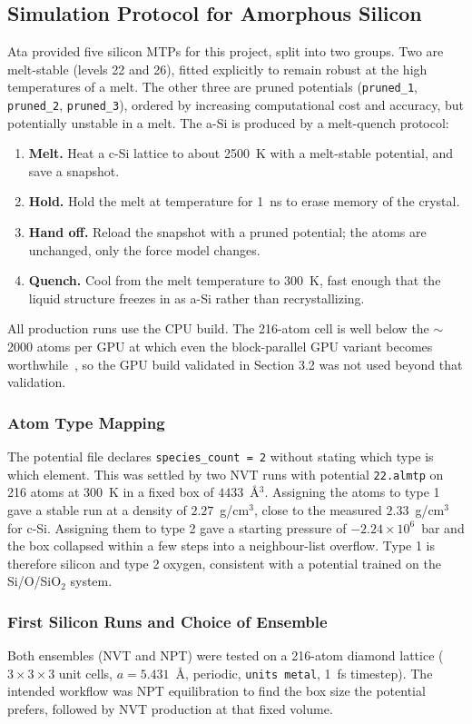 \documentclass{article}
\begin{document}
\subsection{Simulation Protocol for Amorphous Silicon}
Ata provided five silicon MTPs for this project, split into two groups. Two are melt-stable (levels 22 and 26), fitted explicitly to remain robust at the high temperatures of a melt. The other three are pruned potentials (\texttt{pruned\_1}, \texttt{pruned\_2}, \texttt{pruned\_3}), ordered by increasing computational cost and accuracy, but potentially unstable in a melt. The a-Si is produced by a melt-quench protocol:
\begin{enumerate}
    \item \textbf{Melt.} Heat a c-Si lattice to about 2500~K with a melt-stable potential, and save a snapshot.
    \item \textbf{Hold.} Hold the melt at temperature for 1~ns to erase memory of the crystal.
    \item \textbf{Hand off.} Reload the snapshot with a pruned potential; the atoms are unchanged, only the force model changes.
    \item \textbf{Quench.} Cool from the melt temperature to 300~K, fast enough that the liquid structure freezes in as a-Si rather than recrystallizing.
\end{enumerate}
All production runs use the CPU build. The 216-atom cell is well below the $\sim$2000 atoms per GPU at which even the block-parallel GPU variant becomes worthwhile~\cite{meng2026}, so the GPU build validated in Section 3.2 was not used beyond that validation.

\subsubsection{Atom Type Mapping}
The potential file declares \texttt{species\_count = 2} without stating which type is which element. This was settled by two NVT runs with potential \texttt{22.almtp} on 216 atoms at 300~K in a fixed box of $4433$~\AA$^3$. Assigning the atoms to type 1 gave a stable run at a density of $2.27$~g/cm$^3$, close to the measured $2.33$~g/cm$^3$ for c-Si. Assigning them to type 2 gave a starting pressure of $-2.24\times10^{6}$~bar and the box collapsed within a few steps into a neighbour-list overflow. Type 1 is therefore silicon and type 2 oxygen, consistent with a potential trained on the Si/O/SiO$_2$ system.

\subsubsection{First Silicon Runs and Choice of Ensemble}
\label{sec:firstruns}
Both ensembles (NVT and NPT) were tested on a 216-atom diamond lattice ($3\times3\times3$ unit cells, $a=5.431$~\AA, periodic, \texttt{units metal}, 1~fs timestep). The intended workflow was NPT equilibration to find the box size the potential prefers, followed by NVT production at that fixed volume.
\end{document}
